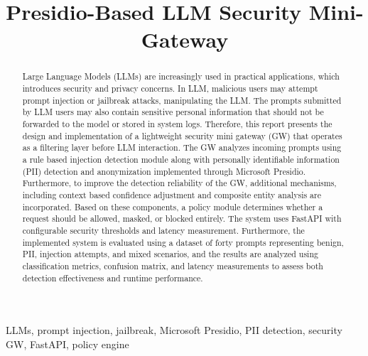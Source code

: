 \documentclass[conference]{IEEEtran}
\begin{document}
\title{Presidio-Based LLM Security Mini-Gateway\\

}

\author{
}

\maketitle


\begin{abstract}
Large Language Models (LLMs) are increasingly used in practical applications, which introduces security and privacy concerns. In LLM, malicious users may attempt prompt injection or jailbreak attacks, manipulating the LLM. The prompts submitted by LLM users may also contain sensitive personal information that should not be forwarded to the model or stored in system logs. Therefore, this report presents the design and implementation of a lightweight security mini gateway (GW) that operates as a filtering layer before LLM interaction. The GW analyzes incoming prompts using a rule based injection detection module along with personally identifiable information (PII) detection and anonymization implemented through Microsoft Presidio. Furthermore, to improve the detection reliability of the GW, additional mechanisms, including context based confidence adjustment and composite entity analysis are incorporated. Based on these components, a policy module determines whether a request should be allowed, masked, or blocked entirely. The system uses FastAPI with configurable security thresholds and latency measurement. %
Furthermore, the implemented system is evaluated using a dataset of forty prompts representing benign, PII, injection attempts, and mixed scenarios, and the results are analyzed using classification metrics, confusion matrix, and latency measurements to assess both detection effectiveness and runtime performance.
\end{abstract}
\begin{IEEEkeywords}
LLMs, prompt injection, jailbreak, Microsoft Presidio, PII detection, security GW, FastAPI, policy engine
\end{IEEEkeywords}
\end{document}

